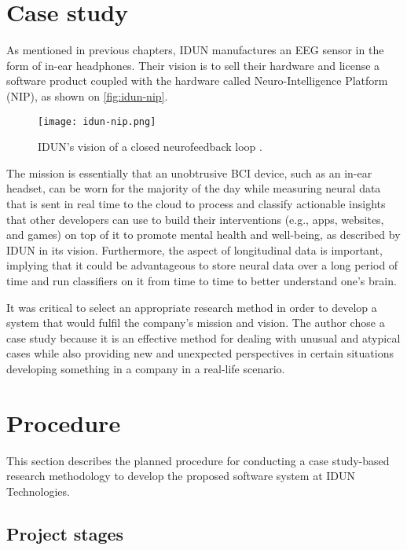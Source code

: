 \section{Case study}
\label{chapter3-case-study}

As mentioned in previous chapters, IDUN manufactures an EEG sensor in the form of in-ear headphones. Their vision is to sell their hardware and license a software product coupled with the hardware called Neuro-Intelligence Platform (NIP), as shown on \autoref{fig:idun-nip}.

\begin{figure}[!ht]
  \centering
  \texttt{[image: idun-nip.png]}
  \caption{IDUN's vision of a closed neurofeedback loop \citep{idun_guardian_nodate}.}
  \label{fig:idun-nip}
\end{figure}

The mission is essentially that an unobtrusive BCI device, such as an in-ear headset, can be worn for the majority of the day while measuring neural data that is sent in real time to the cloud to process and classify actionable insights that other developers can use to build their interventions (e.g., apps, websites, and games) on top of it to promote mental health and well-being, as described by IDUN in its vision. Furthermore, the aspect of longitudinal data is important, implying that it could be advantageous to store neural data over a long period of time and run classifiers on it from time to time to better understand one's brain.

It was critical to select an appropriate research method in order to develop a system that would fulfil the company's mission and vision. The author chose a case study because it is an effective method for dealing with unusual and atypical cases while also providing new and unexpected perspectives in certain situations developing something in a company in a real-life scenario.

\section{Procedure}
\label{chapter3-procedure}

This section describes the planned procedure for conducting a case study-based research methodology to develop the proposed software system at IDUN Technologies.

\subsection{Project stages}
\label{chapter3-project-stages}

